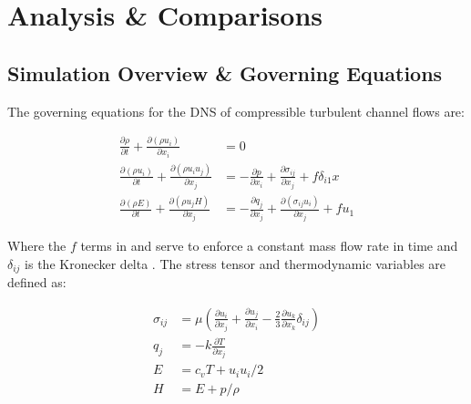 \section{Analysis \& Comparisons}
\subsection{Simulation Overview \& Governing Equations}

The governing equations for the DNS of compressible turbulent channel flows are:

\begin{align}
  \frac{\partial \rho}{\partial t}+\frac{\partial (\rho u_i)}{\partial x_i}           & = 0                                                                                                           \\[.5ex] %
  \frac{\partial (\rho u_i)}{\partial t}+\frac{\partial (\rho u_i u_j)}{\partial x_j} & =-\frac{\partial p}{\partial x_i}+\frac{\partial \sigma_{i j}}{\partial x_j}+f \delta_{i 1} x \label{eqn:mom} \\[.5ex] %
  \frac{\partial (\rho E)}{\partial t}+\frac{\partial (\rho u_j H)}{\partial x_j}     & =-\frac{\partial q_j}{\partial x_j}+\frac{\partial (\sigma_{i j} u_i)}{\partial x_j}+f u_1 \label{eqn:eng}    %
\end{align}

Where the $f$ terms in  and  serve to enforce a constant mass flow rate in time and $\delta_{ij}$ is the Kronecker delta \cite{modestiReynoldsMachNumber2016}. The stress tensor and thermodynamic variables are defined as:

\begin{align}
  \sigma_{i j} & =\mu\left(\frac{\partial u_i}{\partial x_j}+\frac{\partial u_j}{\partial x_i}-\frac{2}{3} \frac{\partial u_k}{\partial x_k} \delta_{i j}\right) \\[.5ex] %
  q_j          & =-k \frac{\partial T}{\partial x_j}                                                                                                             \\[.5ex] %
  E            & =c_v T+u_i u_i / 2                                                                                                                              \\[.5ex] %
  H            & =E+p / \rho                                                                                                                                     %
\end{align}

